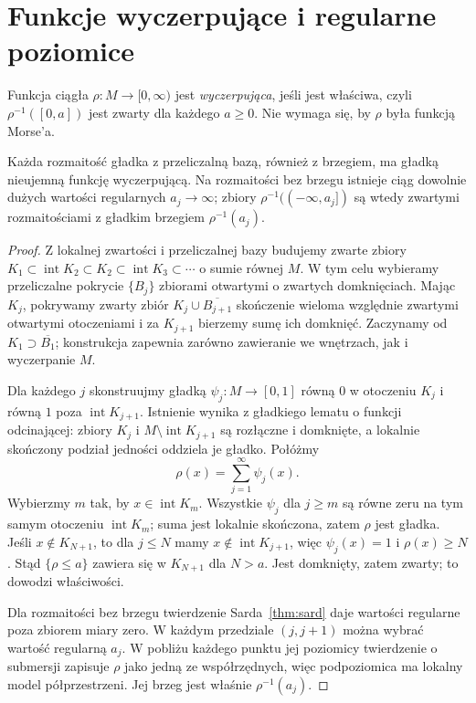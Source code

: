 \section{Funkcje wyczerpujące i regularne poziomice}
\label{sec:wyczerpujace-15}

\begin{definicja}
\label{def:wyczerpujaca-15}
Funkcja ciągła $\rho:M\to[0,\infty)$ jest
\emph{wyczerpująca}, jeśli jest właściwa,
czyli $\rho^{-1}([0,a])$ jest zwarty
dla każdego $a\geq0$.
Nie wymaga się, by $\rho$ była
funkcją Morse'a.
\end{definicja}

\begin{twierdzenie}
\label{thm:wyczerpanie-15}
Każda rozmaitość gładka z przeliczalną
bazą, również z brzegiem, ma gładką
nieujemną funkcję wyczerpującą.
Na rozmaitości bez brzegu istnieje
ciąg dowolnie dużych wartości regularnych
$a_j\to\infty$; zbiory
$\rho^{-1}((-\infty,a_j])$ są wtedy
zwartymi rozmaitościami z gładkim
brzegiem $\rho^{-1}(a_j)$.
\end{twierdzenie}
\begin{proof}
Z lokalnej zwartości i przeliczalnej
bazy budujemy zwarte zbiory
$K_1\subset\operatorname{int}K_2
\subset K_2\subset\operatorname{int}K_3
\subset\cdots$ o sumie równej $M$.
W tym celu wybieramy przeliczalne pokrycie
$\{B_j\}$ zbiorami otwartymi o zwartych domknięciach.
Mając $K_j$, pokrywamy zwarty zbiór
$K_j\cup\overline{B_{j+1}}$ skończenie wieloma
względnie zwartymi otwartymi otoczeniami i za
$K_{j+1}$ bierzemy sumę ich domknięć. Zaczynamy od
$K_1\supset\overline{B_1}$; konstrukcja zapewnia
zarówno zawieranie we wnętrzach, jak i wyczerpanie $M$.

Dla każdego $j$ skonstruujmy
gładką $\psi_j:M\to[0,1]$
równą $0$ w otoczeniu $K_j$
i równą $1$ poza
$\operatorname{int}K_{j+1}$.
Istnienie wynika z gładkiego
lematu o funkcji odcinającej:
zbiory $K_j$ i
$M\setminus\operatorname{int}K_{j+1}$
są rozłączne i domknięte, a
lokalnie skończony podział
jedności oddziela je gładko.
Połóżmy
\[
 \rho(x)=\sum_{j=1}^{\infty}\psi_j(x).
\]
Wybierzmy $m$ tak, by $x\in\operatorname{int}K_m$.
Wszystkie $\psi_j$ dla $j\geq m$ są równe zeru
na tym samym otoczeniu $\operatorname{int}K_m$;
suma jest lokalnie skończona,
zatem $\rho$ jest gładka.
Jeśli $x\notin K_{N+1}$,
to dla $j\leq N$ mamy
$x\notin\operatorname{int}K_{j+1}$,
więc $\psi_j(x)=1$ i $\rho(x)\geq N$.
Stąd $\{\rho\leq a\}$ zawiera się
w $K_{N+1}$ dla $N>a$.
Jest domknięty, zatem zwarty;
to dowodzi właściwości.

Dla rozmaitości bez brzegu
twierdzenie Sarda~\ref{thm:sard}
daje wartości regularne poza
zbiorem miary zero. W każdym
przedziale $(j,j+1)$ można
wybrać wartość regularną $a_j$.
W pobliżu każdego punktu jej
poziomicy twierdzenie o submersji
zapisuje $\rho$ jako jedną
ze współrzędnych, więc podpoziomica
ma lokalny model półprzestrzeni.
Jej brzeg jest właśnie
$\rho^{-1}(a_j)$.
\end{proof}


